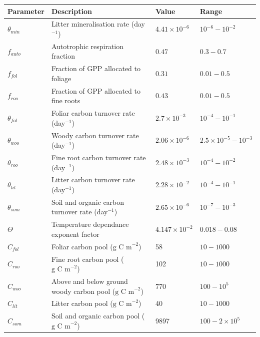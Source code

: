 \begin{center}
\scriptsize
\begin{tabular}{| l | l | l | l |}
\hline
Parameter & Description & Value & Range \\ \hline
$\theta_{min}$ & Litter mineralisation rate (day$^{-1}$) & $4.41\times 10^{-6}$ & $10^{-6} - 10^{-2}$ \\ \hline
$f_{auto}$ & Autotrophic respiration fraction & $0.47$ & $0.3 - 0.7$ \\ \hline
$f_{fol}$ & Fraction of GPP allocated to foliage & $0.31$ & $0.01-0.5$ \\ \hline
$f_{roo}$ & Fraction of GPP allocated to fine roots & $0.43$ & $0.01-0.5$ \\ \hline
$\theta_{fol}$ & Foliar carbon turnover rate (day$^{-1}$) & $2.7\times 10^{-3}$ & $10^{-4} - 10^{-1}$ \\ \hline
$\theta_{woo}$ & Woody carbon turnover rate (day$^{-1}$) & $2.06\times 10^{-6}$ & $2.5\times10^{-5} - 10^{-3}$ \\ \hline
$\theta_{roo}$ & Fine root carbon turnover rate (day$^{-1}$) & $2.48\times 10^{-3}$ & $10^{-4} - 10^{-2}$ \\ \hline
$\theta_{lit}$ & Litter carbon turnover rate (day$^{-1}$) & $2.28\times 10^{-2}$ & $10^{-4} - 10^{-1}$ \\ \hline
$\theta_{som}$ & Soil and organic carbon turnover rate (day$^{-1}$) & $2.65\times 10^{-6}$ & $10^{-7} - 10^{-3}$ \\ \hline
$\Theta$ & Temperature dependance exponent factor & $4.147\times 10^{-2}$ & $0.018 - 0.08$ \\ \hline
$C_{fol}$ & Foliar carbon pool ($\text{g C m}^{-2}$) & 58 & $10 - 1000$  \\ \hline
$C_{roo}$ & Fine root carbon pool ($\text{g C m}^{-2}$) & 102 & $10 - 1000$   \\ \hline
$C_{woo}$ & Above and below ground woody carbon pool ($\text{g C m}^{-2}$) & 770 & $100 - 10^{5}$  \\ \hline
$C_{lit}$ & Litter carbon pool ($\text{g C m}^{-2}$) & 40 & $10 - 1000$   \\ \hline
$C_{som}$ & Soil and organic carbon pool ($\text{g C m}^{-2}$) & 9897 & $100 - 2 \times 10^{5}$  \\ 
\hline
\end{tabular}    
 \label{chap5:table:D1params}
\end{center}

